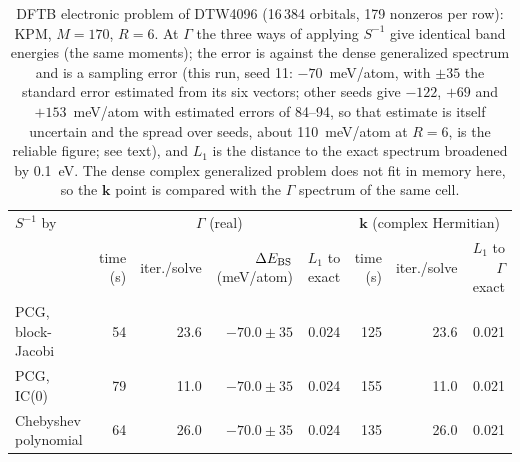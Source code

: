 \begin{table}[t]\caption{DFTB electronic problem of DTW4096 (16\,384 orbitals, 179 nonzeros per row): KPM, $M=170$, $R=6$. At $\Gamma$ the three ways of applying $S^{-1}$ give identical band energies (the same moments); the error is against the dense generalized spectrum and is a sampling error (this run, seed 11: $-70$~meV/atom, with $\pm35$ the standard error estimated from its six vectors; other seeds give $-122$, $+69$ and $+153$~meV/atom with estimated errors of 84--94, so that estimate is itself uncertain and the spread over seeds, about 110~meV/atom at $R=6$, is the reliable figure; see text), and $L_1$ is the distance to the exact spectrum broadened by 0.1~eV. The dense complex generalized problem does not fit in memory here, so the $\mathbf k$ point is compared with the $\Gamma$ spectrum of the same cell.}\label{tab:dd}\begin{ruledtabular}\begin{tabular}{lrrrrrrr}
$S^{-1}$ by & \multicolumn{4}{c}{$\Gamma$ (real)} & \multicolumn{3}{c}{$\mathbf k$ (complex Hermitian)} \\ & time (s) & iter./solve & $\Delta E_{\rm BS}$ (meV/atom) & $L_1$ to exact & time (s) & iter./solve & $L_1$ to $\Gamma$ exact \\ \colrule
PCG, block-Jacobi & 54 & 23.6 & $-70.0\pm35$ & 0.024 & 125 & 23.6 & 0.021 \\
PCG, IC(0) & 79 & 11.0 & $-70.0\pm35$ & 0.024 & 155 & 11.0 & 0.021 \\
Chebyshev polynomial & 64 & 26.0 & $-70.0\pm35$ & 0.024 & 135 & 26.0 & 0.021 \\
\end{tabular}\end{ruledtabular}\end{table}
